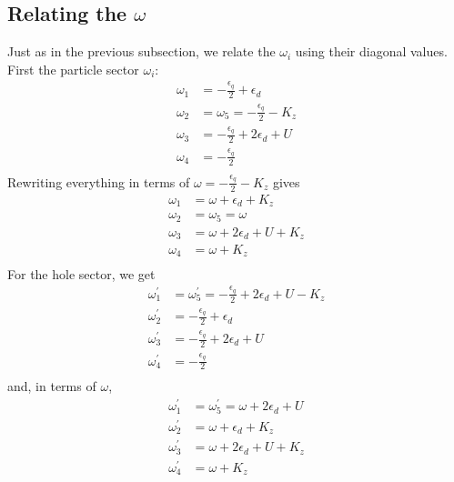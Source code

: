 \documentclass[12pt,twoside]{report}
\numberwithin{equation}{section}
\begin{document}
\subsection{Relating the \(\omega\)}
Just as in the previous subsection, we relate the \(\omega_i\) using their diagonal values.
\pb First the particle sector \(\omega_i\):
\begin{equation}\begin{aligned}
	\omega_1 &= -\frac{\epsilon_q}{2} + \epsilon_d\\
	\omega_2 &= \omega_5 = -\frac{\epsilon_q}{2} - K_z\\
	\omega_3 &= -\frac{\epsilon_q}{2} + 2\epsilon_d + U\\
	\omega_4 &= -\frac{\epsilon_q}{2}\\
\end{aligned}\end{equation}
Rewriting everything in terms of \(\omega = -\frac{\epsilon_q}{2} - K_z\) gives
\begin{equation}\begin{aligned}
	\omega_1 &= \omega + \epsilon_d + K_z\\
	\omega_2 &= \omega_5 = \omega\\
	\omega_3 &= \omega + 2\epsilon_d + U + K_z\\
	\omega_4 &= \omega + K_z\\
\end{aligned}\end{equation}
For the hole sector, we get
\begin{equation}\begin{aligned}
	\omega^\prime_1 &= \omega_5^\prime = -\frac{\epsilon_q}{2} + 2\epsilon_d + U - K_z\\
	\omega^\prime_2 &= -\frac{\epsilon_q}{2} + \epsilon_d\\
	\omega_3^\prime &= -\frac{\epsilon_q}{2} + 2\epsilon_d + U\\
	\omega^\prime_4 &= -\frac{\epsilon_q}{2}\\
\end{aligned}\end{equation}
and, in terms of \(\omega\),
\begin{equation}\begin{aligned}
	\omega^\prime_1 &= \omega_5^\prime = \omega + 2\epsilon_d + U\\
	\omega^\prime_2 &= \omega + \epsilon_d + K_z\\
	\omega_3^\prime &= \omega + 2\epsilon_d + U + K_z\\
	\omega^\prime_4 &= \omega + K_z\\
\end{aligned}\end{equation}
\end{document}
